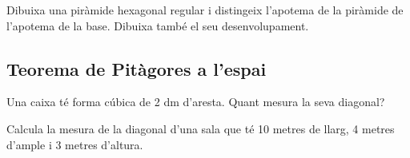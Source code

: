 \begin{mylist}

\exer  Dibuixa una piràmide hexagonal regular i distingeix l'apotema de la piràmide de l'apotema de la base. Dibuixa també el seu desenvolupament.

 

\end{mylist}
\subsection{Teorema de Pitàgores a l'espai}

\begin{mylist}
\exer[1]  Una caixa té forma cúbica de 2 dm d'aresta. Quant mesura la seva diagonal?

\exer[1]  Calcula la mesura de la diagonal d'una sala que té 10 metres de llarg, 4 metres d'ample i 3 metres d'altura.
\end{mylist}
 


